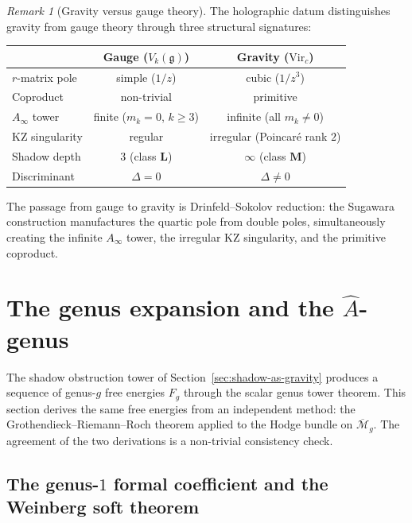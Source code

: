 \documentclass[11pt,reqno]{amsart}
\theoremstyle{definition}
\theoremstyle{remark}
\newtheorem{remark}[theorem]{Remark}
\begin{document}
\begin{remark}[Gravity versus gauge theory]
\label{rem:gravity-vs-gauge}
The holographic datum distinguishes gravity from gauge theory
through three structural signatures:
\begin{center}
\small
\renewcommand{\arraystretch}{1.3}
\begin{tabular}{@{}l|cc@{}}
& \textbf{Gauge} ($V_k(\mathfrak{g})$)
& \textbf{Gravity} ($\mathrm{Vir}_c$) \\
\hline
$r$-matrix pole & simple ($1/z$)
  & cubic ($1/z^3$) \\
Coproduct & non-trivial
  & primitive \\
$A_\infty$ tower & finite ($m_k = 0$, $k \ge 3$)
  & infinite (all $m_k \ne 0$) \\
KZ singularity & regular
  & irregular (Poincar\'{e} rank $2$) \\
Shadow depth & $3$ (class $\mathbf{L}$)
  & $\infty$ (class $\mathbf{M}$) \\
Discriminant & $\Delta = 0$
  & $\Delta \ne 0$ \\
\end{tabular}
\end{center}
The passage from gauge to gravity is Drinfeld--Sokolov reduction:
the Sugawara construction manufactures the quartic pole from
double poles, simultaneously creating the infinite $A_\infty$
tower, the irregular KZ singularity, and the primitive coproduct.
\end{remark}

\section{The genus expansion and the $\hat{A}$-genus}
\label{sec:genus-expansion}

The shadow obstruction tower of Section~\ref{sec:shadow-as-gravity}
produces a sequence of genus-$g$ free energies $F_g$ through the
scalar genus tower theorem. This section derives the same free
energies from an independent method: the Grothendieck--Riemann--Roch
theorem applied to the Hodge bundle on
$\overline{\mathcal{M}}_g$. The agreement of the two derivations
is a non-trivial consistency check.

\subsection{The genus-$1$ formal coefficient and the Weinberg soft theorem}
\end{document}
